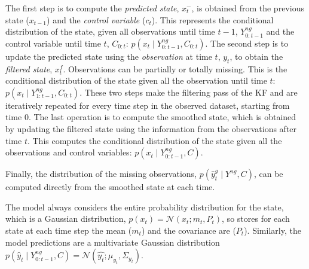\documentclass{article}
\newcommand{\norm}[3]{\mathcal{N}\left(#1; #2, #3\right)} %
\begin{document}

The first step is to compute the \textit{predicted state}, $x^-_t$, is obtained from the previous state ($x_{t-1}$) and the \textit{control variable} ($c_t$). This represents the conditional distribution of the state, given all observations until time $t-1$, $Y^{ng}_{0:t-1}$ and the control variable until time $t$, $C_{0:t}$: $p(x_t \mid Y^{ng}_{0:t-1}, C_{0:t})$.
The second step is to update the predicted state using the \textit{observation} at time $t$, $y_t$, to obtain the \textit{filtered state}, $x^f_t$. Observations can be partially or totally missing. This is the conditional distribution of the state given all the observation until time $t$: $p(x_t \mid Y^{ng}_{1:t-1}, C_{0:t})$.
These two steps make the filtering pass of the KF and are iteratively repeated for every time step in the observed dataset, starting from time $0$.
The last operation is to compute the smoothed state, which is obtained by updating the filtered state using the information from the observations after time $t$. This computes the conditional distribution of the state given all the observations and control variables: $p(x_t \mid Y^{ng}_{0:t-1}, C)$.


Finally, the distribution of the missing observations, $p(\hat{y}^g_t \mid Y^{ng}, C)$, can be computed directly from the smoothed state at each time.

The model always considers the entire probability distribution for the state, which is a Gaussian distribution,  $p(x_t) = \norm{x_t}{m_t}{P_t}$, so stores for each state at each time step the mean ($m_t$) and the covariance are ($P_t$). Similarly, the model predictions are a multivariate Gaussian distribution $p(\hat{y}_t \mid Y^{ng}_{0:t-1}, C) =  \norm{\hat{y_t}}{\mu_{y_t}}{\Sigma_{y_t}}$.
\end{document}
